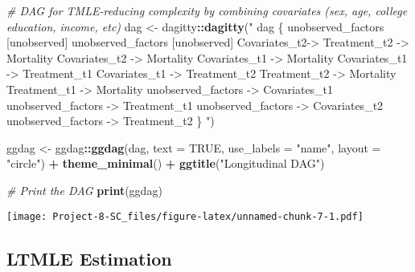 \documentclass[
]{article}
\newenvironment{Shaded}{\begin{snugshade}}{\end{snugshade}}
\newcommand{\AttributeTok}[1]{\textcolor[rgb]{0.13,0.29,0.53}{#1}}
\newcommand{\CommentTok}[1]{\textcolor[rgb]{0.56,0.35,0.01}{\textit{#1}}}
\newcommand{\ConstantTok}[1]{\textcolor[rgb]{0.56,0.35,0.01}{#1}}
\newcommand{\FunctionTok}[1]{\textcolor[rgb]{0.13,0.29,0.53}{\textbf{#1}}}
\newcommand{\NormalTok}[1]{#1}
\newcommand{\OtherTok}[1]{\textcolor[rgb]{0.56,0.35,0.01}{#1}}
\newcommand{\SpecialCharTok}[1]{\textcolor[rgb]{0.81,0.36,0.00}{\textbf{#1}}}
\newcommand{\StringTok}[1]{\textcolor[rgb]{0.31,0.60,0.02}{#1}}
\begin{document}
\begin{Shaded}
\begin{Highlighting}[]
\CommentTok{\# DAG for TMLE{-}reducing complexity by combining covariates (sex, age, college education, income, etc)}
\NormalTok{dag }\OtherTok{\textless{}{-}}\NormalTok{ dagitty}\SpecialCharTok{::}\FunctionTok{dagitty}\NormalTok{(}\StringTok{"}
\StringTok{dag \{}
\StringTok{  unobserved\_factors [unobserved]}
\StringTok{  unobserved\_factors [unobserved]}
\StringTok{  Covariates\_t2{-}\textgreater{} Treatment\_t2 {-}\textgreater{} Mortality}
\StringTok{  Covariates\_t2 {-}\textgreater{} Mortality}
\StringTok{  Covariates\_t1 {-}\textgreater{} Mortality}
\StringTok{   Covariates\_t1 {-}\textgreater{} Treatment\_t1}
\StringTok{  Covariates\_t1 {-}\textgreater{} Treatment\_t2}
\StringTok{  Treatment\_t2 {-}\textgreater{} Mortality}
\StringTok{   Treatment\_t1 {-}\textgreater{} Mortality}
\StringTok{  unobserved\_factors {-}\textgreater{} Covariates\_t1}
\StringTok{  unobserved\_factors {-}\textgreater{} Treatment\_t1}
\StringTok{    unobserved\_factors {-}\textgreater{} Covariates\_t2}
\StringTok{  unobserved\_factors {-}\textgreater{} Treatment\_t2}
\StringTok{\}}
\StringTok{"}\NormalTok{)}


\NormalTok{ggdag }\OtherTok{\textless{}{-}}\NormalTok{ ggdag}\SpecialCharTok{::}\FunctionTok{ggdag}\NormalTok{(dag, }\AttributeTok{text =} \ConstantTok{TRUE}\NormalTok{, }\AttributeTok{use\_labels =} \StringTok{"name"}\NormalTok{, }\AttributeTok{layout =} \StringTok{"circle"}\NormalTok{) }\SpecialCharTok{+}
  \FunctionTok{theme\_minimal}\NormalTok{() }\SpecialCharTok{+}
  \FunctionTok{ggtitle}\NormalTok{(}\StringTok{"Longitudinal DAG"}\NormalTok{)}

\CommentTok{\# Print the DAG}
\FunctionTok{print}\NormalTok{(ggdag)}
\end{Highlighting}
\end{Shaded}

\texttt{[image: Project-8-SC\_files/figure-latex/unnamed-chunk-7-1.pdf]}

\subsection{LTMLE Estimation}\label{ltmle-estimation-1}
\end{document}
